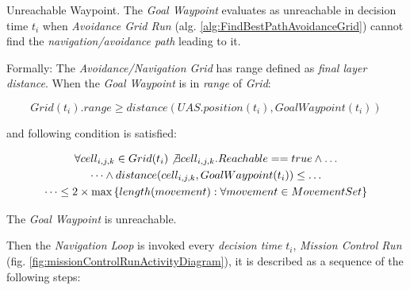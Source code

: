 \begin{definition}{Unreachable Waypoint}\label{def:unreachable Waypoint}. The \emph{Goal Waypoint} evaluates as unreachable in decision time $t_i$ when \emph{Avoidance Grid Run} (alg. \ref{alg:FindBestPathAvoidanceGrid}) cannot find the \emph{navigation/avoidance path} leading to it.

\noindent Formally: The \emph{Avoidance/Navigation Grid} has range defined as \emph{final layer distance}. When the \emph{Goal Waypoint} is in  \emph{range} of \emph{Grid}:

\begin{equation}
    Grid(t_i).range \ge distance(UAS.position(t_i),GoalWaypoint(t_i))
\end{equation}

\noindent and following condition is satisfied:

\begin{multline}\label{eq:unreachableWaypoint}
    \forall cell_{i,j,k}\in Grid(t_i) \not\exists cell_{i,j,k}. Reachable == true \wedge\dots  \\\dots\wedge distance(cell_{i,j,k}, Goal Waypoint(t_i)) \le\dots \\ \dots\le 2 \times \max \left\{length(movement):\forall movement\in MovementSet\right\}
\end{multline}

\noindent The \emph{Goal Waypoint} is unreachable.

\end{definition}

Then the \emph{Navigation Loop} is invoked  every \emph{decision time} $t_i$, \emph{Mission Control Run} (fig. \ref{fig:missionControlRunActivityDiagram}), it is described as a sequence of the following steps:

